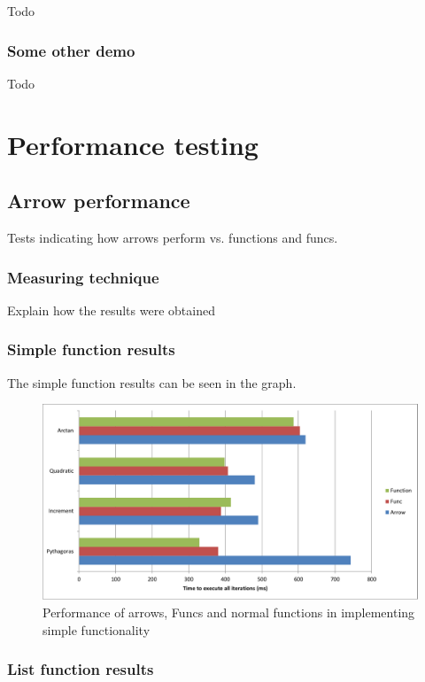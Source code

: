 \documentclass[12pt,twoside,notitlepage]{report}
\begin{document}
Todo

\subsubsection{Some other demo}

Todo

\section{Performance testing}

\subsection{Arrow performance}

Tests indicating how arrows perform vs. functions and funcs.

\subsubsection{Measuring technique}

Explain how the results were obtained

\subsubsection{Simple function results}

The simple function results can be seen in the graph.

\begin{figure}[!ht]
  \centering
  \includegraphics[width=\textwidth]{fig/SimpleFunctionPerformanceChart.pdf}
  \caption{Performance of arrows, Funcs and normal functions in implementing simple functionality}
  \label{fig:simple_function_performance}
\end{figure}

\subsubsection{List function results}
\end{document}
